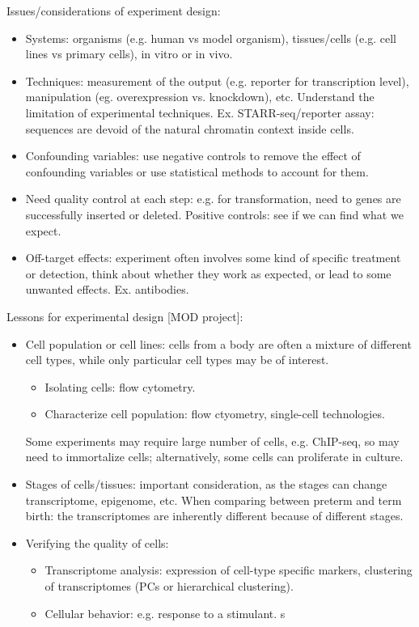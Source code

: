 \documentclass{report}
\begin{document}
Issues/considerations of experiment design: 
\begin{itemize}
	\item Systems: organisms (e.g. human vs model organism), tissues/cells (e.g. cell lines vs primary cells), in vitro or in vivo. 
	
	\item Techniques: measurement of the output (e.g. reporter for transcription level), manipulation (eg. overexpression vs. knockdown), etc. Understand the limitation of experimental techniques. Ex. STARR-seq/reporter assay: sequences are devoid of the natural chromatin context inside cells. 
	
	\item Confounding variables: use negative controls to remove the effect of confounding variables or use statistical methods to account for them.  
	
	\item Need quality control at each step: e.g. for transformation, need to genes are successfully inserted or deleted. Positive controls: see if we can find what we expect.  
	
	\item Off-target effects: experiment often involves some kind of specific treatment or detection, think about whether they work as expected, or lead to some unwanted effects. Ex. antibodies. 
\end{itemize}

Lessons for experimental design [MOD project]: 
\begin{itemize}
	\item Cell population or cell lines: cells from a body are often a mixture of different cell types, while only particular cell types may be of interest. 
	\begin{itemize}
		\item Isolating cells: flow cytometry. 
		\item Characterize cell population: flow ctyometry, single-cell technologies. 
	\end{itemize}
	Some experiments may require large number of cells, e.g. ChIP-seq, so may need to immortalize cells; alternatively, some cells can proliferate in culture. 
	
	\item Stages of cells/tissues: important consideration, as the stages can change transcriptome, epigenome, etc. When comparing between preterm and term birth: the transcriptomes are inherently different because of different stages. 
	
	\item Verifying the quality of cells: 
	\begin{itemize}
		\item Transcriptome analysis: expression of cell-type specific markers, clustering of transcriptomes (PCs or hierarchical clustering). 
		\item Cellular behavior: e.g. response to a stimulant. s 
	\end{itemize} 
\end{itemize}
\end{document}

